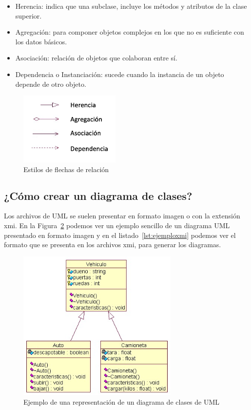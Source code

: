 \documentclass[a4paper, 12pt]{book}
\begin{document}
\begin{itemize}
  \item Herencia: indica que una subclase, incluye los métodos y atributos de la clase superior.
  \item Agregación: para componer objetos complejos en los que no es suficiente con los datos básicos.
  \item Asociación: relación de objetos que colaboran entre sí.
  \item Dependencia o Instanciación: sucede cuando la instancia de un objeto depende de otro objeto.
\end{itemize}

\begin{figure}[htb]
  \centering
  \includegraphics[width=5cm, keepaspectratio]{img/flechasrelacion}
  \caption{Estilos de flechas de relación}
  \label{fig:flechasrelacion}
\end{figure}

\subsection{¿Cómo crear un diagrama de clases?}
\label{subsec:creardiagrama}
Los archivos de UML se suelen presentar en formato imagen o con la extensión xmi. En la Figura~\ref{fig:ejemplouml} podemos ver un ejemplo sencillo de un diagrama UML presentado en formato imagen y en el listado~\ref{lst:ejemploxmi} podemos ver el formato que se presenta en los archivos xmi, para generar los diagramas.

\begin{figure}[htb]
  \centering
  \includegraphics[width=8cm, keepaspectratio]{img/ejemplouml}
  \caption{Ejemplo de una representación de un diagrama de clases de UML}
  \label{fig:ejemplouml}
\end{figure}
\end{document}
